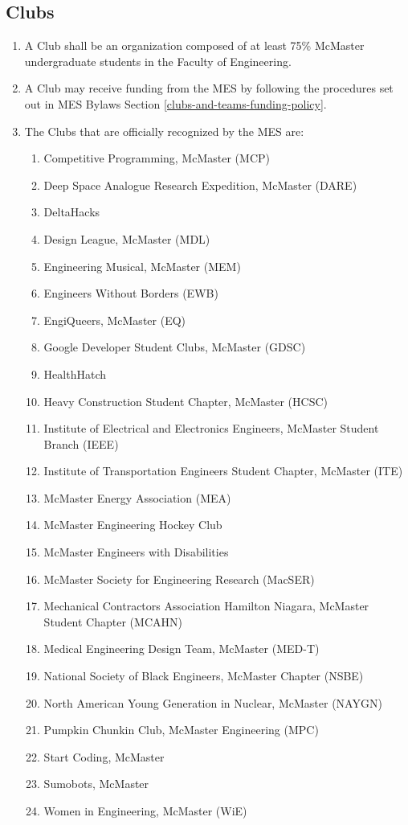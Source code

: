 \subsection{Clubs}
\label{clubs}
\begin{enumerate}
 \item
  A Club shall be an organization composed of at least 75\% McMaster undergraduate students in the Faculty of Engineering.
 \item
  A Club may receive funding from the MES by following the procedures set out in MES Bylaws Section \ref{clubs-and-teams-funding-policy}.
 \item
  The Clubs that are officially recognized by the MES are:

  \begin{enumerate}
   \item
    Competitive Programming, McMaster (MCP)
   \item
    Deep Space Analogue Research Expedition, McMaster (DARE)
   \item
    DeltaHacks
   \item
    Design League, McMaster (MDL)
   \item
    Engineering Musical, McMaster (MEM)
   \item
    Engineers Without Borders (EWB)
   \item
    EngiQueers, McMaster (EQ)
   \item
    Google Developer Student Clubs, McMaster (GDSC)
   \item
    HealthHatch
   \item
    Heavy Construction Student Chapter, McMaster (HCSC)
   \item
    Institute of Electrical and Electronics Engineers, McMaster Student Branch (IEEE)
   \item
    Institute of Transportation Engineers Student Chapter, McMaster (ITE)
   \item
    McMaster Energy Association (MEA)
   \item
    McMaster Engineering Hockey Club
   \item
    McMaster Engineers with Disabilities
   \item
    McMaster Society for Engineering Research (MacSER)
   \item
    Mechanical Contractors Association Hamilton Niagara, McMaster Student Chapter (MCAHN)
   \item
    Medical Engineering Design Team, McMaster (MED-T)
   \item
    National Society of Black Engineers, McMaster Chapter (NSBE)
   \item
    North American Young Generation in Nuclear, McMaster (NAYGN)
   \item
    Pumpkin Chunkin Club, McMaster Engineering (MPC)
   \item
    Start Coding, McMaster
   \item
    Sumobots, McMaster
   \item
    Women in Engineering, McMaster (WiE)
  \end{enumerate}
\end{enumerate}


